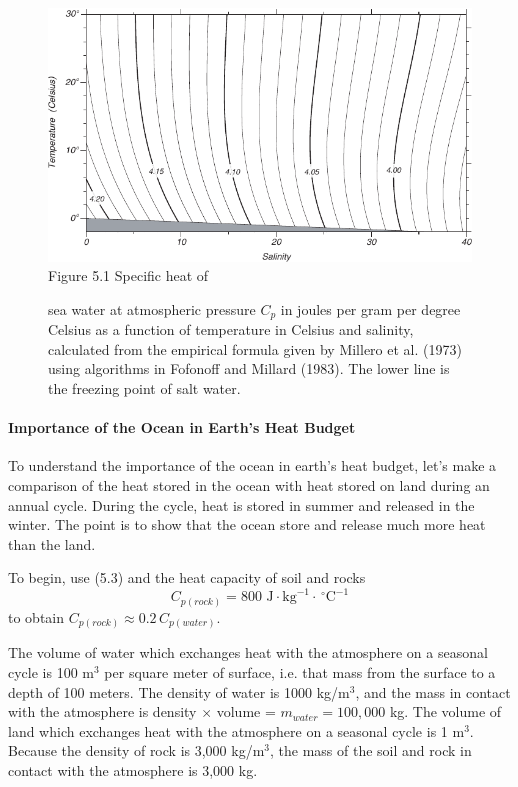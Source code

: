 \begin{figure}[t!]
\includegraphics{pics/Cp}
\footnotesize
Figure 5.1 Specific heat of \rule{0pt}{3ex}sea water at atmospheric
pressure $C_{p}$ in joules per gram per degree Celsius as a function
of temperature in Celsius and salinity, calculated from the empirical
formula given by Millero et al. (1973) using algorithms in Fofonoff
and Millard (1983). The lower line is the freezing point of salt
water.
\label{fig:Cp}
\vspace{-3ex}
\end{figure}

\paragraph{Importance of the Ocean in Earth's Heat Budget}
To understand the importance of the
ocean in earth's heat budget, let's make a comparison of the heat
stored in the ocean with heat stored on land during an annual
cycle. During the cycle, heat is stored in summer and released in the
winter. The point is to show that the ocean store and release much
more heat than the land.

To begin, use (5.3) and the heat capacity of soil and rocks
\begin{equation}
C_{p(rock)} = 800 \mbox{ J}\cdot \mbox{kg}^{-1} \cdot \, ^\circ \mbox{C}^{-1}
\end{equation}
to obtain $C_{p(rock)} \approx 0.2 \, C_{p(water)}$.

The volume of water which exchanges heat with the atmosphere on a
seasonal cycle is 100 m$^3$ per square meter of surface, i.e. that
mass from the surface to a depth of 100 meters. The density of water
is 1000 kg/m$^3$, and the mass in contact with the atmosphere is
density $\times$ volume = $m_{water} = 100,000$ kg. The volume of land
which exchanges heat with the atmosphere on a seasonal cycle is 1
m$^3$. Because the density of rock is 3,000 kg/m$^3$, the mass of the
soil and rock in contact with the atmosphere is 3,000 kg.

